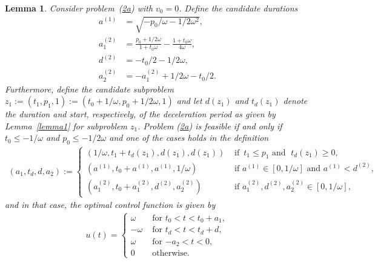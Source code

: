 \documentclass[a4paper]{article}
\theoremstyle{definition}
\theoremstyle{plain}
\newtheorem{lemma}{Lemma}
\begin{document}
\begin{lemma}
  \label{lemma3}
  Consider problem~{\normalfont (\hyperref[eq:setting]{2a})} with $v_{0} = 0$.
  Define the candidate durations
  \begin{align*}
    a^{(1)} &= \sqrt{-p_{0} / \omega - 1/2\omega^{2}} , \\
    a_{1}^{(2)} &= \frac{p_{0} + 1/2\omega}{1 + t_{0}\omega} - \frac{1 + t_{0}\omega}{4 \omega} , \\
    d^{(2)} &= -t_{0}/2 - 1/2\omega , \\
    a_{2}^{(2)} &= -a_{1}^{(2)} + 1/2\omega - t_{0}/2 .
  \end{align*}
  Furthermore, define the candidate subproblem
  $z_{1} := (t_{1}, p_{1}, 1) := (t_{0} + 1 / \omega, p_{0} + 1/2\omega, 1)$ and let
  $d(z_{1})$ and $t_{d}(z_{1})$ denote the duration and start, respectively, of
  the deceleration period as given by Lemma~{\normalfont\ref{lemma1}} for subproblem
  $z_{1}$. Problem {\normalfont (\hyperref[eq:setting]{2a})} is feasible if and
  only if $t_{0} \leq -1/\omega$ and $p_{0} \leq -1/2\omega$ and one of the cases holds
  in the definition
  \begin{align*}
    (a_{1},t_{d},d,a_{2}) := \begin{cases}
              (1 / \omega, t_{1} + t_{d}(z_{1}), d(z_{1}), d(z_{1})) & \text{ if } \, t_{1} \leq p_{1} \text{ and } \; t_{d}(z_{1}) \geq 0 , \\
                               (a^{(1)}, t_{0} + a^{(1)}, a^{(1)}, 1/\omega) & \text{ if }  a^{(1)} \in [0, 1/\omega] \text{ and }  a^{(1)} < d^{(2)} , \\
              (a_{1}^{(2)}, t_{0} + a_{1}^{(2)}, d^{(2)}, a_{2}^{(2)}) & \text{ if } a_{1}^{(2)}, d^{(2)}, a_{2}^{(2)} \in [0, 1/\omega] ,
            \end{cases}
  \end{align*}
  and in that case, the optimal control function is given by
  \begin{align*}
    u(t) = \begin{cases}
             \omega & \text{ for } t_{0} < t < t_{0} + a_{1} , \\
             -\omega & \text{ for } t_{d} < t < t_{d} + d ,\\
             \omega & \text{ for }  {-a_{2}} < t < 0 , \\
             0 & \text{ otherwise. }
           \end{cases}
  \end{align*}
\end{lemma}
\end{document}
